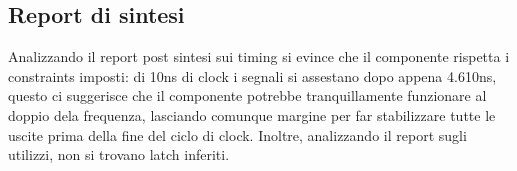 \documentclass[11pt]{article} %
\begin{document}
\subsection{Report di sintesi}
Analizzando il report post sintesi sui timing si evince che il componente rispetta i constraints imposti: di 10ns di clock i segnali si assestano dopo appena 4.610ns, questo ci suggerisce che il componente potrebbe tranquillamente funzionare al doppio dela frequenza, lasciando comunque margine per far stabilizzare tutte le uscite prima della fine del ciclo di clock. Inoltre, analizzando il report sugli utilizzi, non si trovano latch inferiti.



\end{document}
